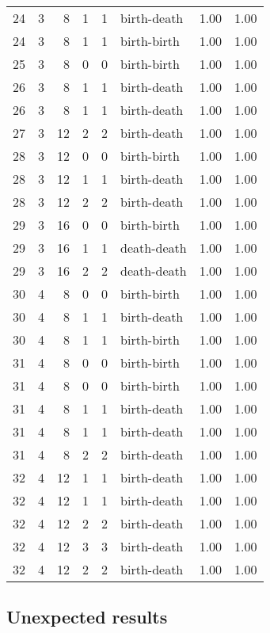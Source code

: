 \documentclass{article}
\begin{document}
\begin{center}
\begin{tabular}{rrrrrlrr}
24 & 3 & 8 & 1 & 1 & birth-death & 1.00 & 1.00 \\
24 & 3 & 8 & 1 & 1 & birth-birth & 1.00 & 1.00 \\
25 & 3 & 8 & 0 & 0 & birth-birth & 1.00 & 1.00 \\
26 & 3 & 8 & 1 & 1 & birth-death & 1.00 & 1.00 \\
26 & 3 & 8 & 1 & 1 & birth-death & 1.00 & 1.00 \\
27 & 3 & 12 & 2 & 2 & birth-death & 1.00 & 1.00 \\
28 & 3 & 12 & 0 & 0 & birth-birth & 1.00 & 1.00 \\
28 & 3 & 12 & 1 & 1 & birth-death & 1.00 & 1.00 \\
28 & 3 & 12 & 2 & 2 & birth-death & 1.00 & 1.00 \\
29 & 3 & 16 & 0 & 0 & birth-birth & 1.00 & 1.00 \\
29 & 3 & 16 & 1 & 1 & death-death & 1.00 & 1.00 \\
29 & 3 & 16 & 2 & 2 & death-death & 1.00 & 1.00 \\
30 & 4 & 8 & 0 & 0 & birth-birth & 1.00 & 1.00 \\
30 & 4 & 8 & 1 & 1 & birth-death & 1.00 & 1.00 \\
30 & 4 & 8 & 1 & 1 & birth-birth & 1.00 & 1.00 \\
31 & 4 & 8 & 0 & 0 & birth-birth & 1.00 & 1.00 \\
31 & 4 & 8 & 0 & 0 & birth-birth & 1.00 & 1.00 \\
31 & 4 & 8 & 1 & 1 & birth-death & 1.00 & 1.00 \\
31 & 4 & 8 & 1 & 1 & birth-death & 1.00 & 1.00 \\
31 & 4 & 8 & 2 & 2 & birth-death & 1.00 & 1.00 \\
32 & 4 & 12 & 1 & 1 & birth-death & 1.00 & 1.00 \\
32 & 4 & 12 & 1 & 1 & birth-death & 1.00 & 1.00 \\
32 & 4 & 12 & 2 & 2 & birth-death & 1.00 & 1.00 \\
32 & 4 & 12 & 3 & 3 & birth-death & 1.00 & 1.00 \\
32 & 4 & 12 & 2 & 2 & birth-death & 1.00 & 1.00 \\
\bottomrule
\end{tabular}
\end{center}


\subsection{Unexpected results}
\end{document}
